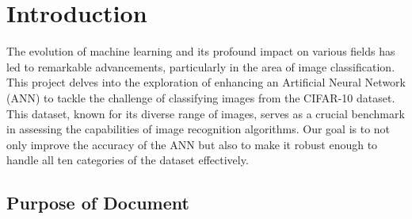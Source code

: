 \documentclass[12pt]{article}
\begin{document}


\section{Introduction}

The evolution of machine learning and its profound impact on various fields has led to remarkable advancements, 
particularly in the area of image classification. This project delves into the exploration of enhancing an 
Artificial Neural Network (ANN) to tackle the challenge of classifying images from the CIFAR-10 dataset. 
This dataset, known for its diverse range of images, serves as a crucial benchmark in assessing the 
capabilities of image recognition algorithms. Our goal is to not only improve the accuracy of the ANN but 
also to make it robust enough to handle all ten categories of the dataset effectively.

\subsection{Purpose of Document}
\end{document}
